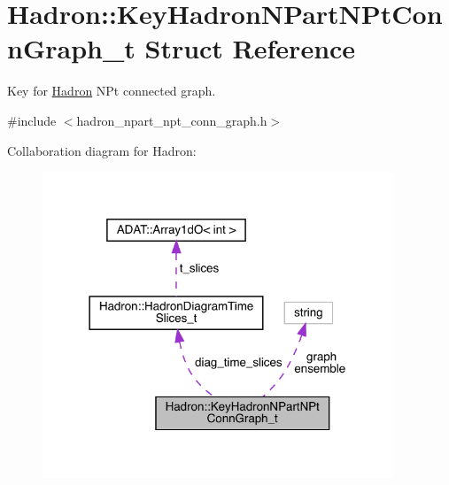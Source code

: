 \hypertarget{structHadron_1_1KeyHadronNPartNPtConnGraph__t}{}\section{Hadron\+:\+:Key\+Hadron\+N\+Part\+N\+Pt\+Conn\+Graph\+\_\+t Struct Reference}
\label{structHadron_1_1KeyHadronNPartNPtConnGraph__t}


Key for \mbox{\hyperlink{namespaceHadron}{Hadron}} N\+Pt connected graph.  




{\ttfamily \#include $<$hadron\+\_\+npart\+\_\+npt\+\_\+conn\+\_\+graph.\+h$>$}



Collaboration diagram for Hadron\+:\nopagebreak
\begin{figure}[H]
\begin{center}
\leavevmode
\includegraphics[width=297pt]{db/d41/structHadron_1_1KeyHadronNPartNPtConnGraph__t__coll__graph}
\end{center}
\end{figure}
